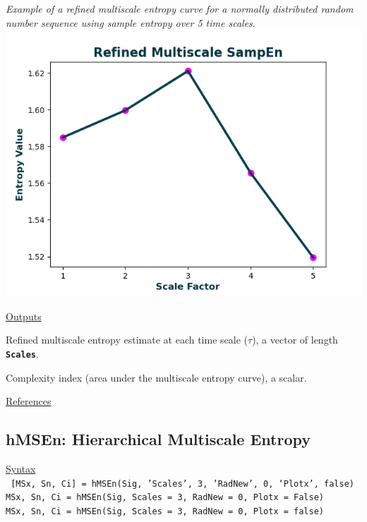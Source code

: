 \documentclass[12pt, a4paper, titlepage, openany]{book}
\begin{document}
\begin{description}[labelsep=1cm, labelwidth=2cm, nosep, style=multiline,leftmargin=3cm]
\textit{Example of a refined multiscale entropy curve for a normally distributed random number sequence using sample entropy over 5 time scales}.\\
							\includegraphics[scale=.7]{rMSEn1.png}
\end{description}

\noindent \ul{Outputs}
\begin{description}[labelsep=1cm, labelwidth=2cm, nosep, style=multiline,leftmargin=3cm]\footnotesize
\item[\texttt{MSx}]		Refined multiscale entropy estimate at each time scale ($\tau$), a vector of length 											\textbf{\texttt{Scales}}.
\item[\texttt{Ci}]		Complexity index (area under the multiscale entropy curve), a scalar.
\end{description}

\noindent \ul{References}\hspace{1cm}
\cite{MS1} \cite{MS2} \cite{MS3} \cite{rMS1} \cite{rMS2} 



\newpage
\subsection{\normalsize hMSEn: \hspace{15mm} Hierarchical Multiscale Entropy}
\noindent\ul{Syntax} \vspace{6mm} \\ \noindent \texttt{\footnotesize
[MSx, Sn, Ci] = hMSEn(Sig, 'Scales', 3, 'RadNew', 0, ‘Plotx’, false)\\
MSx, Sn, Ci = hMSEn(Sig, Scales = 3, RadNew = 0, Plotx = False)\\ 
MSx, Sn, Ci = hMSEn(Sig, Scales = 3, RadNew = 0, Plotx = false)}
\end{document}
